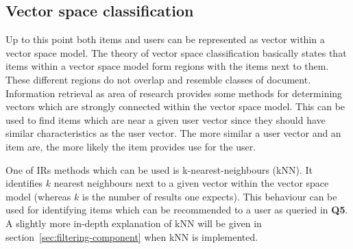 \subsection{Vector space classification}
Up to this point both items and users can be represented as vector within a vector space model.
The theory of vector space classification basically states that items within a vector space model form regions with the items next to them.
These different regions do not overlap and resemble classes of document.
\citep[p.~298-291]{manning:2009}
Information retrieval as area of research provides some methods for determining vectors which are strongly connected within the vector space model.
This can be used to find items which are near a given user vector since they should have similar characteristics as the user vector.
The more similar a user vector and an item are, the more likely the item provides use for the user.
\citep[p.~298-291]{manning:2009}

One of IRs methods which can be used is k-nearest-neighbours (kNN).
It identifies $k$ nearest neighbours next to a given vector within the vector space model (whereas $k$ is the number of results one expects).
This behaviour can be used for identifying items which can be recommended to a user as queried in \textbf{Q5}.
A slightly more in-depth explanation of kNN will be given in section~\ref{sec:filtering-component} when kNN is implemented.
%

